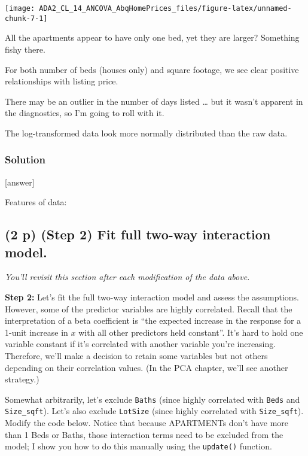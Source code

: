 \documentclass[
  12pt,
]{article}
\begin{document}
\begin{center}\texttt{[image: ADA2\_CL\_14\_ANCOVA\_AbqHomePrices\_files/figure-latex/unnamed-chunk-7-1]} \end{center}

All the apartments appear to have only one bed, yet they are larger?
Something fishy there.

For both number of beds (houses only) and square footage, we see clear
positive relationships with listing price.

There may be an outlier in the number of days listed \ldots{} but it
wasn't apparent in the diagnostics, so I'm going to roll with it.

The log-transformed data look more normally distributed than the raw
data.

\hypertarget{solution-1}{%
\subsubsection{Solution}\label{solution-1}}

{[}answer{]}

Features of data:

\hypertarget{p-step-2-fit-full-two-way-interaction-model.}{%
\subsection{\texorpdfstring{\textbf{(2 p)} (Step 2) Fit full two-way
interaction
model.}{(2 p) (Step 2) Fit full two-way interaction model.}}\label{p-step-2-fit-full-two-way-interaction-model.}}

\emph{You'll revisit this section after each modification of the data
above.}

\textbf{Step 2:} Let's fit the full two-way interaction model and assess
the assumptions. However, some of the predictor variables are highly
correlated. Recall that the interpretation of a beta coefficient is
``the expected increase in the response for a 1-unit increase in \(x\)
with all other predictors held constant''. It's hard to hold one
variable constant if it's correlated with another variable you're
increasing. Therefore, we'll make a decision to retain some variables
but not others depending on their correlation values. (In the PCA
chapter, we'll see another strategy.)

Somewhat arbitrarily, let's exclude \texttt{Baths} (since highly
correlated with \texttt{Beds} and \texttt{Size\_sqft}). Let's also
exclude \texttt{LotSize} (since highly correlated with
\texttt{Size\_sqft}). Modify the code below. Notice that because
APARTMENTs don't have more than 1 Beds or Baths, those interaction terms
need to be excluded from the model; I show you how to do this manually
using the \texttt{update()} function.
\end{document}
